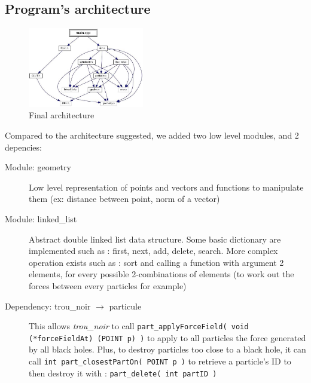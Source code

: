 \documentclass[a4paper]{article} %
\begin{document}
\begin{multicols*}{2}
\section{Program's architecture}


\begin{figure}[H]
\centering
\includegraphics[width=0.45\textwidth]{architecture.jpg}
\caption{Final architecture}
\end{figure}


Compared to the architecture suggested, we added two low level modules, and 2 depencies:
\begin{description}
\item[Module: geometry]
Low level representation of points and vectors and functions to manipulate them (ex: distance between point, norm of a vector)


\item[Module: linked\_list]
Abstract double linked list data structure.
Some basic dictionary are implemented such as : first, next, add, delete, search.
More complex operation exists such as : sort and calling a function with argument 2 elements, for every possible 2-combinations of elements
(to work out the forces between every particles for example)


\item[Dependency: trou\_noir $\rightarrow$ particule]
This allows \emph{trou\_noir} to call \texttt{part\_applyForceField( void (*forceFieldAt) (POINT p) )}
to apply to all particles the force generated by all black holes.
Plus, to destroy particles too close to a black hole, it can call \texttt{int part\_closestPartOn( POINT p )}
to retrieve a particle's ID to then destroy it with : \texttt{part\_delete( int partID )}


\end{description}
\end{multicols*}
\end{document}
